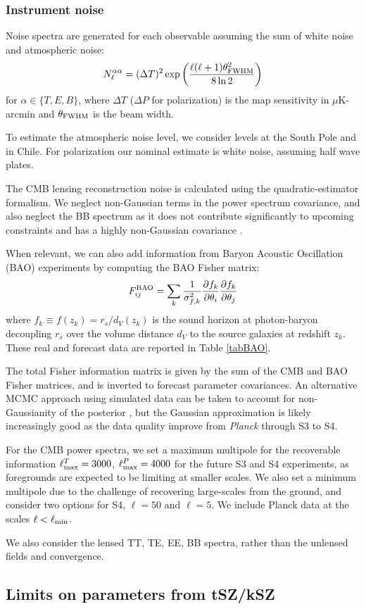 \subsubsection{Instrument noise}
Noise spectra are generated for each observable assuming the sum of white noise and atmospheric noise:
%
\begin{equation}
N^{\alpha \alpha}_\ell = (\Delta T)^2 \exp \left( \frac{\ell(\ell + 1) \theta^2_{\rm FWHM}}{8 \ln 2} \right)
\end{equation}
%
for $\alpha \in \{T, E, B\}$, where $\Delta T$ ($\Delta P$ for polarization) is the map sensitivity in $\mu$K-arcmin and $\theta_{\rm FWHM}$ is the beam width. 

To estimate the atmospheric noise level, we consider levels at the South Pole and in Chile.
For polarization our nominal estimate is white noise, assuming half wave plates.

%
The CMB lensing reconstruction noise is calculated using the \cite{Hu:2002} quadratic-estimator formalism. We neglect non-Gaussian terms in the power spectrum covariance, and also neglect the BB spectrum as it does not contribute significantly to upcoming constraints and has a highly non-Gaussian covariance \cite{Benoit-Levy:2012}. 

When relevant, we can also add information from Baryon Acoustic Oscillation (BAO) experiments by computing the BAO Fisher matrix:
%
\begin{equation}
F_{ij}^{\rm BAO} = \sum_{k} \frac{1}{\sigma_{f,k}^2}\frac{\partial f_k}{\partial \theta_i}\frac{\partial f_k}{\partial \theta_j}
\end{equation}
%
where $f_k \equiv f(z_k) = r_s/d_V(z_k)$ is the sound horizon at photon-baryon decoupling $r_s$ over the volume distance $d_V$ to the source galaxies at redshift $z_k$. These real and forecast data are reported in Table \ref{tabBAO}.

The total Fisher information matrix is given by the sum of the CMB and BAO Fisher matrices, and is inverted to forecast parameter covariances.  An alternative MCMC approach using simulated data can be taken to account for non-Gaussianity of the posterior \cite[e.g.,][]{Hall:2012}, but the Gaussian approximation is likely increasingly good as the data quality improve from {\sl Planck} through S3 to S4. 

For the CMB power spectra, we set a maximum multipole for the recoverable information $\ell^T_{\rm max} = 3000$, $\ell^P_{\rm max} = 4000$ for the future S3 and S4 experiments, as foregrounds are expected to be limiting at smaller scales. We also set a minimum multipole due to the challenge of recovering large-scales from the ground, and consider two options for S4, $\ell=50$ and $\ell=5$. We include Planck data at the scales $\ell<\ell_{\rm min}$. 

We also consider the lensed TT, TE, EE, BB spectra, rather than the unlensed fields and convergence.




\subsection{Limits on parameters from tSZ/kSZ}
